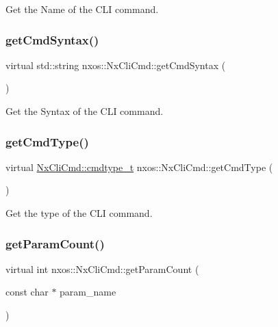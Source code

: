 Get the Name of the C\+LI command. 

\mbox{\label{classnxos_1_1_nx_cli_cmd_a0568d5404d91ddb89135e632e05d7abe}} 
\subsubsection{\texorpdfstring{get\+Cmd\+Syntax()}{getCmdSyntax()}}
{\footnotesize\ttfamily virtual std\+::string nxos\+::\+Nx\+Cli\+Cmd\+::get\+Cmd\+Syntax (\begin{DoxyParamCaption}{ }\end{DoxyParamCaption})\hspace{0.3cm}{\ttfamily [pure virtual]}}



Get the Syntax of the C\+LI command. 

\mbox{\label{classnxos_1_1_nx_cli_cmd_ab9dce490e4854f1160ba08fdc646bd37}} 
\subsubsection{\texorpdfstring{get\+Cmd\+Type()}{getCmdType()}}
{\footnotesize\ttfamily virtual \mbox{\hyperlink{classnxos_1_1_nx_cli_cmd_a82ed104f13c7859b24d3c0527f706be1}{Nx\+Cli\+Cmd\+::cmdtype\+\_\+t}} nxos\+::\+Nx\+Cli\+Cmd\+::get\+Cmd\+Type (\begin{DoxyParamCaption}{ }\end{DoxyParamCaption})\hspace{0.3cm}{\ttfamily [pure virtual]}}



Get the type of the C\+LI command. 

\mbox{\label{classnxos_1_1_nx_cli_cmd_a12e56ced4646ba1a27417030c0d20e7b}} 
\subsubsection{\texorpdfstring{get\+Param\+Count()}{getParamCount()}}
{\footnotesize\ttfamily virtual int nxos\+::\+Nx\+Cli\+Cmd\+::get\+Param\+Count (\begin{DoxyParamCaption}\item[{const char $\ast$}]{param\+\_\+name }\end{DoxyParamCaption})\hspace{0.3cm}{\ttfamily [pure virtual]}}

